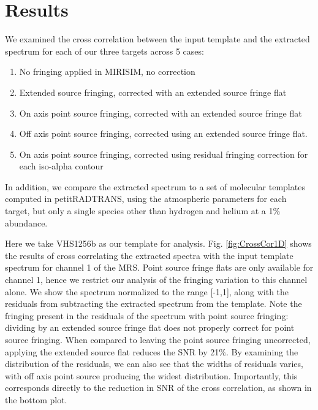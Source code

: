 \section{Results}
We examined the cross correlation between the input template and the extracted spectrum for each of our three targets across 5 cases:
\begin{enumerate}
	\item No fringing applied in MIRISIM, no correction
	\item Extended source fringing, corrected with an extended source fringe flat
	\item On axis point source fringing, corrected with an extended source fringe flat
	\item Off axis point source fringing, corrected using an extended source fringe flat.
	\item On axis point source fringing, corrected using residual fringing correction for each iso-alpha contour
\end{enumerate}
In addition, we compare the extracted spectrum to a set of molecular templates computed in petitRADTRANS, using the atmospheric parameters for each target, but only a single species other than hydrogen and helium at a 1\% abundance.

Here we take VHS1256b as our template for analysis.
Fig. \ref{fig:CrossCor1D} shows the results of cross correlating the extracted spectra with the input template spectrum for channel 1 of the MRS.
Point source fringe flats are only available for channel 1, hence we restrict our analysis of the fringing variation to this channel alone.
We show the spectrum normalized to the range [-1,1], along with the residuals from subtracting the extracted spectrum from the template.
Note the fringing present in the residuals of the spectrum with point source fringing: dividing by an extended source fringe flat does not properly correct for point source fringing.
When compared to leaving the point source fringing uncorrected, applying the extended source flat reduces the SNR by 21\%.
By examining the distribution of the residuals, we can also see that the widths of residuals varies, with off axis point source producing the widest distribution.
Importantly, this corresponds directly to the reduction in SNR of the cross correlation, as shown in the bottom plot. 

